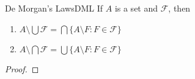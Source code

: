 \begin{theorem}{De Morgan's Laws}{DML}
    If $A$ is a set and $\mathcal{F}$, then\\
    \begin{enumerate}
        \item $A \setminus \bigcup \mathcal{F} = \bigcap \{A \setminus F: F \in \mathcal{F}\}$
        \item $A \setminus \bigcap \mathcal{F} = \bigcup \{A \setminus F: F \in \mathcal{F}\}$
    \end{enumerate}
\end{theorem}

\begin{proof}
    
\end{proof}
